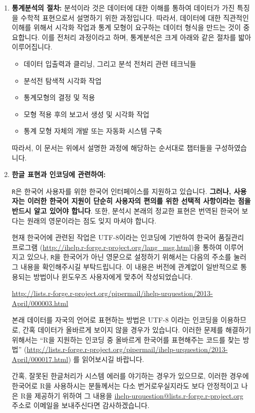 \documentclass{book}
\begin{document}
\begin{enumerate}
  \item \textbf{통계분석의 절차:} 분석이라 것은 데이터에 대한 이해를 통하여 데이터가 가진 특징을 수학적 표현으로서 설명하기 위한 과정입니다. 
따라서, 데이터에 대한 직관적인 이해를 위해서 시각화 작업과 통계 모형이 요구하는 데이터 형식을 만드는 것이 중요합니다. 
이를 전처리 과정이라고 하며, 통계분석은 크게 아래와 같은 절차를 밟아 이루어집니다.

\begin{itemize}
\item 데이터 입출력과 클리닝, 그리고 분석 전처리 관련 테크닉들
\item 분석전 탐색적 시각화 작업 
\item 통계모형의 결정 및 적용 
\item 모형 적용 후의 보고서 생성 및 시각화 작업
\item 통계 모형 자체의 개발 또는 자동화 시스템 구축
\end{itemize}

따라서, 이 문서는 위에서 설명한 과정에 해당하는 순서대로 챕터들을 구성하였습니다. 


  \item \textbf{한글 표현과 인코딩에 관련하여:}


  \texttt{R}은 한국어 사용자를 위한 한국어 인터페이스를 지원하고 있습니다. 
\textbf{그러나, 사용자는 이러한 한국어 지원이 단순히 사용자의 편의를 위한 선택적 사항이라는 점을 반드시 알고 있어야 합니다}.
또한, 분석시 본래의 정교한 표현은 번역된 한국어 보다는 원래의 영문이라는 점도 잊지 마셔야 합니다. 

현재 한국어에 관련된 작업은 UTF-8이라는 인코딩에 기반하여 한국어 품질관리 프로그램 (\url{http://ihelp.r-forge.r-project.org/lang_msg.html})을 통하여 이루어 지고 있으나, \texttt{R}을 한국어가 아닌 영문으로 설정하기 위해서는 다음의 주소를 눌러 그 내용을 확인해주시길 부탁드립니다. 
이 내용은 버전에 관계없이 일반적으로 통용되는 방법이나 윈도우즈 사용자에게 맞추어 작성되었습니다. 

\url{http://lists.r-forge.r-project.org/pipermail/ihelp-urquestion/2013-April/000003.html}

본래 데이터를 자국의 언어로 표현하는 방법은 UTF-8 이라는 인코딩을 이용하므로, 간혹 데이터가 올바르게 보이지 않을 경우가 있습니다. 
이러한 문제를 해결하기 위해서는 ``R을 지원하는 인코딩 중 올바르게 한국어를 표현해주는 코드를 찾는 방법'' (\url{http://lists.r-forge.r-project.org/pipermail/ihelp-urquestion/2013-April/000017.html}) 를 읽어보시길 바랍니다.

간혹, 잘못된 한글처리가 시스템 에러를 야기하는 경우가 있으므로, 이러한 경우에 한국어로 R을 사용하시는 분들께서는 다소 번거로우실지라도 보다 안정적이고 나은 R을 제공하기 위하여 그 내용을 \href{mailto:ihelp-urquestion@lists.r-forge.r-project.org}{ihelp-urquestion@lists.r-forge.r-project.org} 주소로 이메일을 보내주신다면 감사하겠습니다. 


\end{enumerate}
\end{document}
